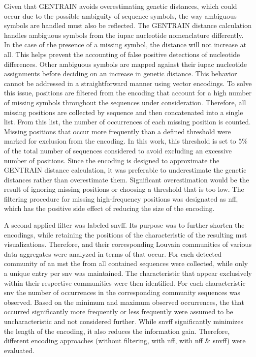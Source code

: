 Given that GENTRAIN avoids overestimating genetic distances, which could occur due to the possible ambiguity of sequence symbols, the way ambiguous symbols are handled must also be reflected. The GENTRAIN distance calculation handles ambiguous symbols from the \acrshort{iupac} nucleotide nomenclature differently. In the case of the presence of a missing symbol, the distance will not increase at all. This helps prevent the accounting of false positive detections of nucleotide differences. Other ambiguous symbols are mapped against their \acrshort{iupac} nucleotide assignments before deciding on an increase in genetic distance. This behavior cannot be addressed in a straightforward manner using vector encodings. To solve this issue, positions are filtered from the encoding that account for a high number of missing symbols throughout the sequences under consideration. 
Therefore, all missing positions are collected by sequence and then concatenated into a single list. From this list, the number of occurrences of each missing position is counted. Missing positions that occur more frequently than a defined threshold were marked for exclusion from the encoding. In this work, this threshold is set to 5\% of the total number of sequences considered to avoid excluding an excessive number of positions. Since the encoding is designed to approximate the GENTRAIN distance calculation, it was preferable to underestimate the genetic distances rather than overestimate them. Significant overestimation would be the result of ignoring missing positions or choosing a threshold that is too low.
The filtering procedure for missing high-frequency positions was designated as \acrfull{nff}, which has the positive side effect of reducing the size of the encoding. 

A second applied filter was labeled \acrfull{snvff}. Its purpose was to further shorten the encodings, while retaining the positions of the characteristic  of the resulting \acrshort{mst} visualizations. Therefore,  and their corresponding Louvain communities of various data aggregates were analyzed in terms of  that occur. For each detected community of an \acrshort{mst} the  from all contained sequences were collected, while only a unique entry per \acrshort{snv} was maintained. The characteristic  that appear exclusively within their respective communities were then identified. For each characteristic \acrshort{snv} the number of occurrences in the corresponding community sequences was observed. Based on the minimum and maximum observed occurrences, the  that occurred significantly more frequently or less frequently were assumed to be uncharacteristic and not considered further. While \acrshort{snvff} significantly minimizes the length of the encoding, it also reduces the information gain. Therefore, different encoding approaches (without filtering, with \acrshort{nff}, with \acrshort{nff} \& \acrshort{snvff}) were evaluated.

